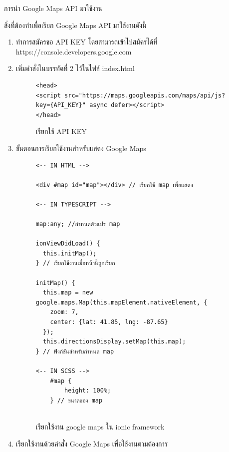 \begin{enumerate}
	การนำ Google Maps API มาใช้งาน

	สิ่งที่ต้องทำเพื่อเรียก Google Maps API มาใช้งานดังนี้
	\begin{enumerate}[label=\arabic*)]
		\item ทำการสมัครขอ API KEY โดยสามารถเข้าไปสมัครได้ที่ https://console.developers.google.com
		\item เพิ่มคำสั่งในบรรทัดที่ 2 ไว้ในไฟล์ index.html
		
		\begin{figure}[H]
			{\begin{lstlisting}
<head>
<script src="https://maps.googleapis.com/maps/api/js?key={API_KEY}" async defer></script>
</head>
		\end{lstlisting}}
	\centering
		\caption{เรียกใช้ API KEY}
		\label{Fig:googlemapapi}
	\end{figure}

	\item ขั้นตอนการเรียกใช้งานสำหรับแสดง Google Maps
	
	\begin{figure}[H]
		{\begin{lstlisting}
<-- IN HTML -->

<div #map id="map"></div> // เรียกใช้ map เพื่อแสดง

<-- IN TYPESCRIPT -->

map:any; //กำหนดตัวแปร map

ionViewDidLoad() {
  this.initMap();
} // เรียกใช้งานเมื่อหน้านี้ถูกเรียก

initMap() {
  this.map = new google.maps.Map(this.mapElement.nativeElement, {
    zoom: 7,
    center: {lat: 41.85, lng: -87.65}
  });
  this.directionsDisplay.setMap(this.map);
} // ฟังก์ชันสำหรับกำหนด map

<-- IN SCSS -->
	#map {
		height: 100%;
	} // ขนาดของ map
					
				\end{lstlisting}}
			\centering
				\caption{เรียกใช้งาน google maps ใน ionic framework}
				\label{Fig:googlemapionic}
			\end{figure}
			\item เรียกใช้งานด้วยคำสั่ง Google Maps เพื่อใช้งานตามต้องการ
		\end{enumerate}
		
	  


\end{enumerate}
